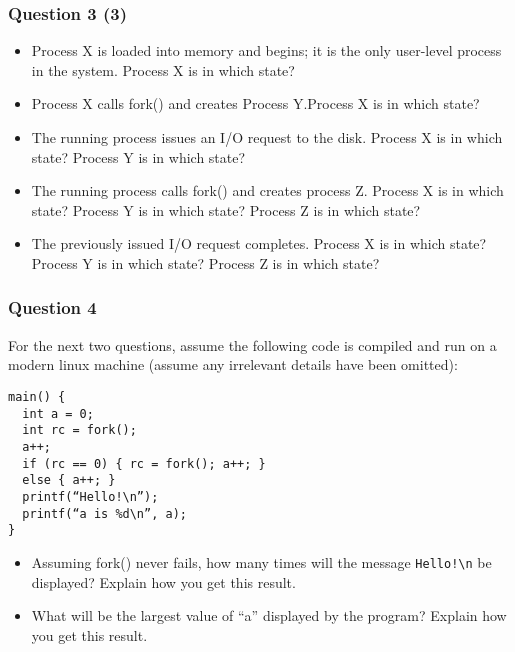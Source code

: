   \begin{frame}
    \frametitle{Question 3 (3)}

    \begin{itemize}
      \item Process X is loaded into memory and begins; it is the only
            user-level process in the system. Process X is in which state?
      \item Process X calls fork() and creates Process Y.Process X is in which
            state?
      \item The running process issues an I/O request to the disk. Process X is
            in which state? Process Y is in which state?
      \item The running process calls fork() and creates process Z. Process X is
            in which state? Process Y is in which state? Process Z is in which
            state?
      \item The previously issued I/O request completes. Process X is in which
            state? Process Y is in which state? Process Z is in which state?
    \end{itemize}
  \end{frame}

  \begin{frame}[fragile]
    \frametitle{Question 4}

    For the next two questions, assume the following code is compiled and run on
    a modern linux machine (assume any irrelevant details have been omitted):

    \begin{lstlisting}
main() {
  int a = 0;
  int rc = fork();
  a++;
  if (rc == 0) { rc = fork(); a++; }
  else { a++; }
  printf(“Hello!\n”);
  printf(“a is %d\n”, a);
}
    \end{lstlisting}

    \begin{itemize}
      \item Assuming fork() never fails, how many times will the message
            \lstinline|Hello!\n| be displayed? Explain how you get this result.
      \item What will be the largest value of “a” displayed by the program?
            Explain how you get this result.
    \end{itemize}
  \end{frame}

